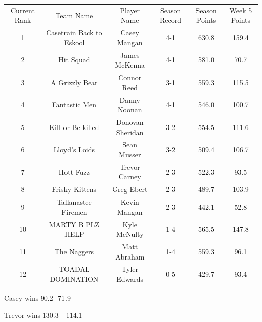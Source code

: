 \documentclass[11pt,letterpaper]{article}
\begin{document}
\newpage
{}
\vspace{-25pt}
\begin{table} [h]
\footnotesize
\begin{center}
\begin{tabular} { c c c c c c }
\\[3mm] Current Rank & Team Name & Player Name & Season Record &  Season Points & Week 5 Points
\\[3mm] 1 & Casetrain Back to Eskool & Casey Mangan & 4-1 & 630.8 & 159.4
\\ 2 & Hit Squad & James McKenna & 4-1 & 581.0 & 70.7
\\ 3 &  A Grizzly Bear & Connor Reed & 3-1 & 559.3 & 115.5
\\ 4 & Fantastic Men & Danny Noonan & 4-1 & 546.0 & 100.7
\\ 5 & Kill or Be killed & Donovan Sheridan & 3-2 & 554.5 & 111.6
\\ 6 & Lloyd's Loids & Sean Musser & 3-2 & 509.4 & 106.7
\\ 7 & Hott Fuzz & Trevor Carney & 2-3 & 522.3 & 93.5
\\ 8 & Frisky Kittens & Greg Ebert & 2-3 & 489.7 & 103.9
\\ 9 & Tallanastee Firemen & Kevin Mangan & 2-3 & 442.1 & 52.8
\\ 10 & MARTY B PLZ HELP & Kyle McNulty & 1-4 & 565.5 & 147.8
\\ 11 & The Naggers & Matt Abraham & 1-4 & 559.3 & 96.1
\\ 12 & TOADAL DOMINATION & Tyler Edwards & 0-5 & 429.7 & 93.4
\end{tabular}
\end{center}
\end{table}


\newpage
{}



\par\noindent Casey wins 90.2 -71.9
\bigskip
\par\noindent




{}
\par\noindent Trevor wins 130.3 - 114.1 
\bigskip
\par\noindent
\end{document}
